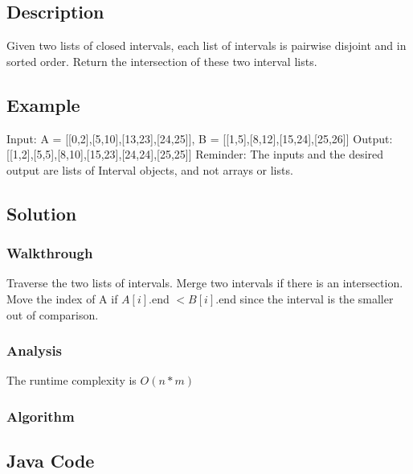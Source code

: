 \documentclass[]{book}
\begin{document}
\hypertarget{description-20}{%
\subsection{Description}\label{description-20}}

Given two lists of closed intervals, each list of intervals is pairwise disjoint and in sorted order.
Return the intersection of these two interval lists.

\hypertarget{example-19}{%
\subsection{Example}\label{example-19}}

Input: A = {[}{[}0,2{]},{[}5,10{]},{[}13,23{]},{[}24,25{]}{]}, B = {[}{[}1,5{]},{[}8,12{]},{[}15,24{]},{[}25,26{]}{]}
Output: {[}{[}1,2{]},{[}5,5{]},{[}8,10{]},{[}15,23{]},{[}24,24{]},{[}25,25{]}{]}
Reminder: The inputs and the desired output are lists of Interval objects, and not arrays or lists.

\hypertarget{solution-15}{%
\subsection{Solution}\label{solution-15}}

\hypertarget{walkthrough-19}{%
\subsubsection{Walkthrough}\label{walkthrough-19}}

Traverse the two lists of intervals. Merge two intervals if there is an intersection. Move the index of A if
\(A[i]\).end \(< B[i]\).end since the interval is the smaller out of comparison.

\hypertarget{analysis-21}{%
\subsubsection{Analysis}\label{analysis-21}}

The runtime complexity is \(O(n * m)\)

\hypertarget{algorithm-21}{%
\subsubsection{Algorithm}\label{algorithm-21}}

\hypertarget{java-code-17}{%
\subsection{Java Code}\label{java-code-17}}
\end{document}
